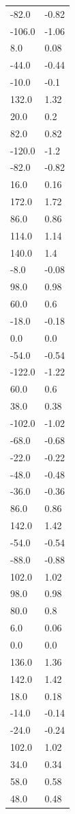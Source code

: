 \begin{longtable}{ll}
-82.0 & -0.82 \\
-106.0 & -1.06 \\
8.0 & 0.08 \\
-44.0 & -0.44 \\
-10.0 & -0.1 \\
132.0 & 1.32 \\
20.0 & 0.2 \\
82.0 & 0.82 \\
-120.0 & -1.2 \\
-82.0 & -0.82 \\
16.0 & 0.16 \\
172.0 & 1.72 \\
86.0 & 0.86 \\
114.0 & 1.14 \\
140.0 & 1.4 \\
-8.0 & -0.08 \\
98.0 & 0.98 \\
60.0 & 0.6 \\
-18.0 & -0.18 \\
0.0 & 0.0 \\
-54.0 & -0.54 \\
-122.0 & -1.22 \\
60.0 & 0.6 \\
38.0 & 0.38 \\
-102.0 & -1.02 \\
-68.0 & -0.68 \\
-22.0 & -0.22 \\
-48.0 & -0.48 \\
-36.0 & -0.36 \\
86.0 & 0.86 \\
142.0 & 1.42 \\
-54.0 & -0.54 \\
-88.0 & -0.88 \\
102.0 & 1.02 \\
98.0 & 0.98 \\
80.0 & 0.8 \\
6.0 & 0.06 \\
0.0 & 0.0 \\
136.0 & 1.36 \\
142.0 & 1.42 \\
18.0 & 0.18 \\
-14.0 & -0.14 \\
-24.0 & -0.24 \\
102.0 & 1.02 \\
34.0 & 0.34 \\
58.0 & 0.58 \\
48.0 & 0.48 \\

\end{longtable}
